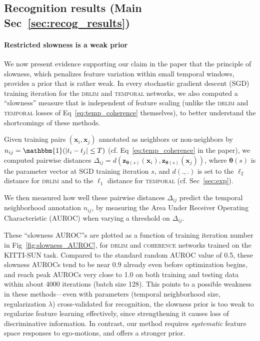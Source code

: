 \documentclass[10pt,twocolumn,letterpaper]{article}
\begin{document}
\begin{table}[t]
\end{table}\subsection{Recognition results (Main Sec~\ref{sec:recog_results})}\paragraph{Restricted slowness is a weak prior} We now present evidence supporting our claim in the paper that the principle of slowness, which penalizes feature variation within small temporal windows, provides a prior that is rather weak. In every stochastic gradient descent (SGD) training iteration for the \textsc{drlim} and \textsc{temporal} networks, we also computed a ``slowness'' measure that is independent of feature scaling (unlike the \textsc{drlim} and \textsc{temporal} losses of Eq~\ref{eq:temp_coherence} themselves), to better understand the shortcomings of these methods.

Given training pairs $(\bm{x}_i,\bm{x}_j)$ annotated as neighbors or non-neighbors by $n_{ij}=\mathbbm{1}(|t_i-t_j|\leq T)$ (cf. Eq~\eqref{eq:temp_coherence} in the paper), we computed pairwise distances $\Delta_{ij}=d(\mathbf{z}_{\bm{\theta}(s)}(\bm{x}_i), \mathbf{z}_{\bm{\theta}(s)}(\bm{x}_j))$, where $\bm{\theta}(s)$ is the parameter vector at SGD training iteration $s$, and $d(.,.)$ is set to the $\ell_2$ distance for \textsc{drlim} and to the $\ell_1$ distance for \textsc{temporal} (cf. Sec~\ref{sec:exp}).

We then measured how well these pairwise distances $\Delta_{ij}$ predict the temporal neighborhood annotation $n_{ij}$, by measuring the Area Under Receiver Operating Characteristic (AUROC) when varying a threshold on $\Delta_{ij}$.

These ``slowness AUROC''s are plotted as a function of training iteration number in Fig~\ref{fig:slowness_AUROC}, for \textsc{drlim} and \textsc{coherence} networks trained on the KITTI-SUN task. Compared to the standard random AUROC value of 0.5, these slowness AUROCs tend to be near 0.9 already even before optimization begins, and reach peak AUROCs very close to 1.0 on both training and testing data within about 4000 iterations (batch size 128). This points to a possible weakness in these methods---even with parameters (temporal neighborhood size, regularization $\lambda$) cross-validated for recognition, the slowness prior is too weak to regularize feature learning effectively, since strengthening it causes loss of discriminative information. In contrast, our method requires \emph{systematic} feature space responses to ego-motions, and offers a stronger prior.
\end{document}
